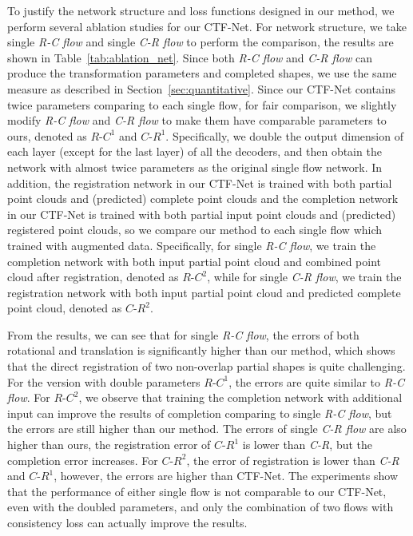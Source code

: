 To justify the network structure and loss functions designed in our method, we perform several ablation studies for our CTF-Net.
For network structure, we take single \textit{R-C flow} and single \textit{C-R flow} to perform the comparison, the results are shown in Table~\ref{tab:ablation_net}. Since both \textit{R-C flow} and \textit{C-R flow} can produce the transformation parameters and completed shapes, we use the same measure as described in Section~\ref{sec:quantitative}.
Since our CTF-Net contains twice parameters comparing to each single flow, for fair comparison, we slightly modify \textit{R-C flow} and \textit{C-R flow} to make them have comparable parameters to ours, denoted as $\textit{R-C}^1$ and $\textit{C-R}^1$.
Specifically, we double the output dimension of each layer (except for the last layer) of all the decoders, and then obtain the network with almost twice parameters as the original single flow network.
In addition, the registration network in our CTF-Net is trained with both partial point clouds and (predicted) complete point clouds and the completion network in our CTF-Net is trained with both partial input point clouds and (predicted) registered point clouds, so we compare our method to each single flow which trained with augmented data.
Specifically, for single \textit{R-C flow}, we train the completion network with both input partial point cloud and combined point cloud after registration, denoted as $\textit{R-C}^2$, while for single \textit{C-R flow}, we train the registration network with both input partial point cloud and predicted complete point cloud, denoted as $\textit{C-R}^2$.

From the results, we can see that for single \textit{R-C flow}, the errors of both rotational and translation is significantly higher than our method, which shows that the direct registration of two non-overlap partial shapes is quite challenging. For the version with double parameters $\textit{R-C}^1$, the errors are quite similar to \textit{R-C flow}. For $\textit{R-C}^2$, we observe that training the completion network with additional input can improve the results of completion comparing to single \textit{R-C flow}, but the errors are still higher than our method.
The errors of single \textit{C-R flow} are also higher than ours, the registration error of $\textit{C-R}^1$ is lower than \textit{C-R}, but the completion error increases. For $\textit{C-R}^2$, the error of registration is lower than \textit{C-R} and $\textit{C-R}^1$, however, the errors are higher than CTF-Net.
The experiments show that the performance of either single flow is not comparable to our CTF-Net, even with the doubled parameters,  and only the combination of two flows with consistency loss can actually improve the results.

